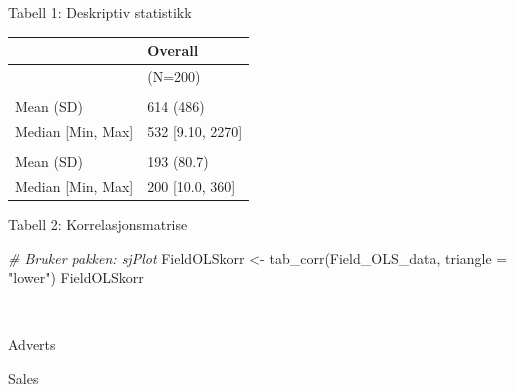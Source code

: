 \documentclass[
]{article}
\newenvironment{Shaded}{\begin{snugshade}}{\end{snugshade}}
\newcommand{\AttributeTok}[1]{\textcolor[rgb]{0.77,0.63,0.00}{#1}}
\newcommand{\CommentTok}[1]{\textcolor[rgb]{0.56,0.35,0.01}{\textit{#1}}}
\newcommand{\FunctionTok}[1]{\textcolor[rgb]{0.00,0.00,0.00}{#1}}
\newcommand{\NormalTok}[1]{#1}
\newcommand{\OtherTok}[1]{\textcolor[rgb]{0.56,0.35,0.01}{#1}}
\newcommand{\SpecialCharTok}[1]{\textcolor[rgb]{0.00,0.00,0.00}{#1}}
\newcommand{\StringTok}[1]{\textcolor[rgb]{0.31,0.60,0.02}{#1}}
\begin{document}
Tabell 1: Deskriptiv statistikk

\begin{Shaded}
\end{Shaded}

\begin{tabular}[t]{ll}
\toprule
  & Overall\\
\midrule
 & (N=200)\\
\addlinespace[0.3em]
\multicolumn{2}{l}{\textbf{Adverts}}\\
\hspace{1em}Mean (SD) & 614 (486)\\
\hspace{1em}Median [Min, Max] & 532 [9.10, 2270]\\
\addlinespace[0.3em]
\multicolumn{2}{l}{\textbf{Sales}}\\
\hspace{1em}Mean (SD) & 193 (80.7)\\
\hspace{1em}Median [Min, Max] & 200 [10.0, 360]\\
\bottomrule
\end{tabular}

Tabell 2: Korrelasjonsmatrise

\begin{Shaded}
\begin{Highlighting}[]
\CommentTok{\# Bruker pakken: sjPlot}
\NormalTok{FieldOLSkorr }\OtherTok{\textless{}{-}} \FunctionTok{tab\_corr}\NormalTok{(Field\_OLS\_data, }\AttributeTok{triangle =} \StringTok{"lower"}\NormalTok{)}
\NormalTok{FieldOLSkorr}
\end{Highlighting}
\end{Shaded}

~

Adverts

Sales
\end{document}
